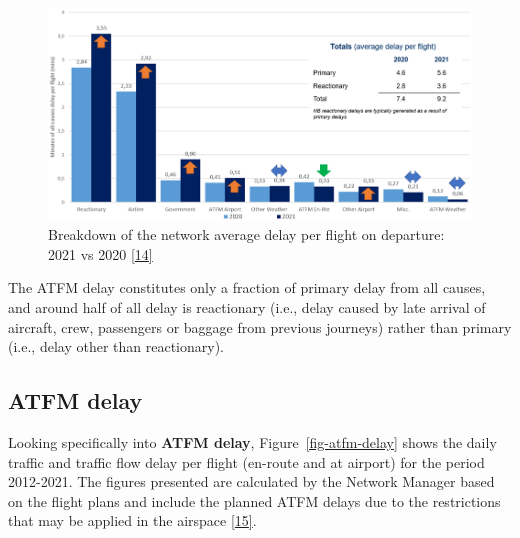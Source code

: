\documentclass[
  11pt,
  a4paper,
]{book}
\begin{document}
\begin{figure}

{\centering \includegraphics{chapters/../figures/delay_causes.png}

}

\caption{\label{fig-all-causes-delay}Breakdown of the network average
delay per flight on departure: 2021 vs 2020
\protect\hyperlink{ref-coda2021}{{[}14{]}}}

\end{figure}

The ATFM delay constitutes only a fraction of primary delay from all
causes, and around half of all delay is reactionary (i.e., delay caused
by late arrival of aircraft, crew, passengers or baggage from previous
journeys) rather than primary (i.e., delay other than reactionary).

\hypertarget{atfm-delay}{%
\subsection{ATFM delay}\label{atfm-delay}}

Looking specifically into \textbf{ATFM delay},
Figure~\ref{fig-atfm-delay} shows the daily traffic and traffic flow
delay per flight (en-route and at airport) for the period 2012-2021. The
figures presented are calculated by the Network Manager based on the
flight plans and include the planned ATFM delays due to the restrictions
that may be applied in the airspace
\protect\hyperlink{ref-nm2022}{{[}15{]}}.
\end{document}
